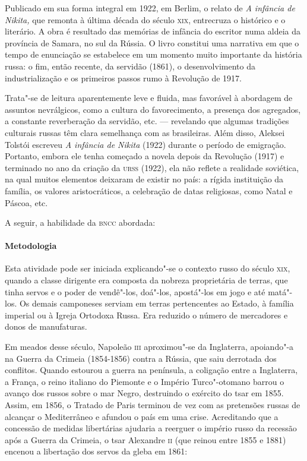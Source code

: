 \documentclass[11pt]{extarticle}
\begin{document}
Publicado em sua forma integral em 1922, em Berlim, o relato de \emph{A
infância de Nikita,} que remonta à última década do século \textsc{xix},
entrecruza o histórico e o literário. A obra é resultado das memórias de
infância do escritor numa aldeia da província de Samara, no sul da Rússia. O livro constitui
uma narrativa em que o tempo de enunciação se estabelece em um momento
muito importante da história russa: o fim, então recente, da servidão
(1861), o desenvolvimento da industrialização e os primeiros passos rumo
à Revolução de 1917.

Trata"-se de leitura aparentemente leve e fluida, mas favorável à
abordagem de assuntos nevrálgicos, como a cultura do favorecimento, a
presença dos agregados, a constante reverberação da servidão, etc. ---
revelando que algumas tradições culturais russas têm clara semelhança
com as brasileiras. Além disso, Aleksei Tolstói escreveu \emph{A
infância de Nikita} (1922) durante o período de emigração. Portanto,
embora ele tenha começado a novela depois da Revolução (1917) e
terminado no ano da criação da \textsc{urss} (1922), ela não reflete a realidade
soviética, na qual muitos elementos deixaram de existir no país: a
rígida instituição da família, os valores aristocráticos, a celebração
de datas religiosas, como Natal e Páscoa, etc.

A seguir, a habilidade da \textsc{bncc} abordada:


\paragraph{Metodologia}
Esta atividade pode ser iniciada explicando"-se o contexto russo do
século \textsc{xix}, quando a classe dirigente era composta da nobreza
proprietária de terras, que tinha servos e o poder de vendê"-los,
doá"-los, apostá"-los em jogo e até matá"-los. Os demais camponeses serviam
em terras pertencentes ao Estado, à família imperial ou à Igreja
Ortodoxa Russa. Era reduzido o número de mercadores e donos de
manufaturas.


Em meados desse século, Napoleão \textsc{iii} aproximou"-se da Inglaterra,
apoiando"-a na Guerra da Crimeia (1854-1856) contra a Rússia, que saiu
derrotada dos conflitos. Quando estourou a guerra na península, a
coligação entre a Inglaterra, a França, o reino italiano do Piemonte e o
Império Turco"-otomano barrou o avanço dos russos sobre o mar Negro,
destruindo o exército do tsar em 1855. Assim, em 1856, o Tratado de
Paris terminou de vez com as pretensões russas de alcançar o
Mediterrâneo e afundou o país em uma crise. Acreditando que a concessão
de medidas libertárias ajudaria a reerguer o império russo da recessão
após a Guerra da Crimeia, o tsar Alexandre \textsc{ii} (que reinou entre 1855 e
1881) encenou a libertação dos servos da gleba em 1861:
\end{document}
